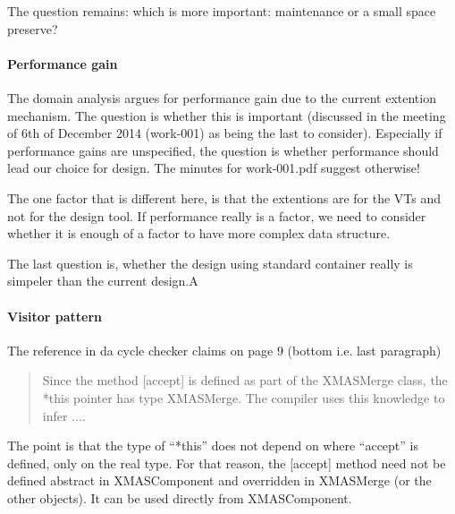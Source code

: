The question remains: which is more important: maintenance or a small space preserve?

\paragraph{Performance gain}

The domain analysis argues for performance gain due to the current extention mechanism. The question
is whether this is important (discussed in the meeting of 6th of December 2014 (work-001)
as being the last to consider). Especially if performance gains are unspecified, the question is 
whether performance should lead our choice for design. The minutes for work-001.pdf suggest otherwise!

The one factor that is different here, is that the extentions are for the VTs and not for the 
design tool. If performance really is a factor, we need to consider whether it is enough of 
a factor to have more complex data structure.

The last question is, whether the design using standard container really is simpeler than the current design.A

\paragraph{Visitor pattern}

The reference in da cycle checker claims on page 9 (bottom i.e. last paragraph) 

\begin{quote}
	Since the method [accept] is defined as part of the XMASMerge class, the *this pointer has type
	XMASMerge. The compiler uses this knowledge  to infer  ....
\end{quote}

The point is that the type of ``*this'' does not depend on where ``accept'' is defined,
only on the real type. For that reason, the [accept] method need not be defined abstract in
XMASComponent and overridden in XMASMerge (or the other objects). It can be used directly from
XMASComponent.
